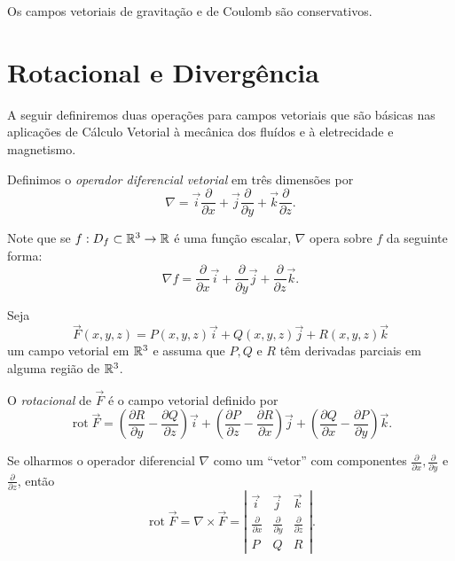 \begin{remark}
    Os campos vetoriais de gravitação e de Coulomb são conservativos.
\end{remark}

\section{Rotacional e Divergência}

A seguir definiremos duas operações para campos vetoriais que são básicas nas aplicações de Cálculo Vetorial à mecânica dos fluídos e à eletrecidade e magnetismo.

\begin{definition}
    Definimos o \textit{operador diferencial vetorial} em três dimensões por \[\nabla = \overrightarrow{i} \frac{\partial}{\partial x} + \overrightarrow{j} \frac{\partial}{\partial y} + \overrightarrow{k} \frac{\partial}{\partial z}.\]
\end{definition}

Note que se \(f:D_f\subset\mathbb{R}^3\to\mathbb{R}\) é uma função escalar, \(\nabla\) opera sobre \(f\) da seguinte forma: \[\nabla f =  \frac{\partial}{\partial x}\overrightarrow{i} +  \frac{\partial}{\partial y}\overrightarrow{j} +  \frac{\partial}{\partial z}\overrightarrow{k}.\]

\begin{definition}
    Seja \[\overrightarrow{F}(x,y,z) = P(x,y,z)\overrightarrow{i} + Q(x,y,z)\overrightarrow{j} + R(x,y,z)\overrightarrow{k}\] um campo vetorial em \(\mathbb{R}^3\) e assuma que \(P,Q\) e \(R\) têm derivadas parciais em alguma região de \(\mathbb{R}^3\).

    O \textit{rotacional} de \(\overrightarrow{F}\) é o campo vetorial definido por \[\operatorname{rot} \overrightarrow{F} = \left( \frac{\partial R}{\partial y} - \frac{\partial Q}{\partial z} \right)\overrightarrow{i} + \left( \frac{\partial P}{\partial z} - \frac{\partial R}{\partial x} \right)\overrightarrow{j} + \left( \frac{\partial Q}{\partial x} - \frac{\partial P}{\partial y} \right)\overrightarrow{k}.\]
\end{definition}

Se olharmos o operador diferencial \(\nabla\) como um ``vetor'' com componentes \(\frac{\partial}{\partial x}, \frac{\partial}{\partial y}\) e \(\frac{\partial}{\partial z}\), então \[\operatorname{rot}\overrightarrow{F} = \nabla \times \overrightarrow{F} = \left|\begin{matrix}
    \overrightarrow{i} & \overrightarrow{j} & \overrightarrow{k}  \\
    \frac{\partial}{\partial x} & \frac{\partial}{\partial y} & \frac{\partial}{\partial z} \\
    P & Q & R
\end{matrix}\right|.\]

